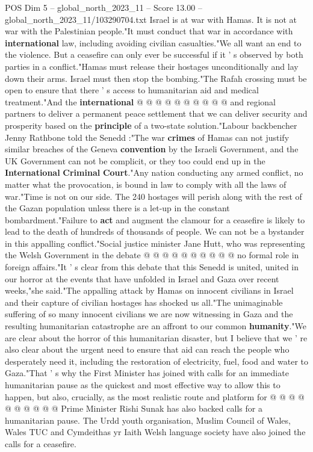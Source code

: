 \begin{textsample}{POS Dim 5 – global\_north\_2023\_11 – Score 13.00 – global\_north\_2023\_11/103290704.txt}
Israel is at war with Hamas.
It is not at war with the Palestinian people."It must conduct that war in accordance with \textbf{international} law, including avoiding civilian casualties."We all want an end to the violence.
But a ceasefire can only ever be successful if it ' s observed by both parties in a conflict."Hamas must release their hostages unconditionally and lay down their arms.
Israel must then stop the bombing."The Rafah crossing must be open to ensure that there ' s access to humanitarian aid and medical treatment."And the \textbf{international} @ @ @ @ @ @ @ @ @ @ and regional partners to deliver a permanent peace settlement that we can deliver security and prosperity based on the \textbf{principle} of a two-state solution."Labour backbencher Jenny Rathbone told the Senedd :"The war \textbf{crimes} of Hamas can not justify similar breaches of the Geneva \textbf{convention} by the Israeli Government, and the UK Government can not be complicit, or they too could end up in the \textbf{International} \textbf{Criminal} \textbf{Court}."Any nation conducting any armed conflict, no matter what the provocation, is bound in law to comply with all the laws of war."Time is not on our side.
The 240 hostages will perish along with the rest of the Gazan population unless there is a let-up in the constant bombardment."Failure to \textbf{act} and augment the clamour for a ceasefire is likely to lead to the death of hundreds of thousands of people.
We can not be a bystander in this appalling conflict."Social justice minister Jane Hutt, who was representing the Welsh Government in the debate @ @ @ @ @ @ @ @ @ @ no formal role in foreign affairs."It ' s clear from this debate that this Senedd is united, united in our horror at the events that have unfolded in Israel and Gaza over recent weeks,"she said."The appalling attack by Hamas on innocent civilians in Israel and their capture of civilian hostages has shocked us all."The unimaginable suffering of so many innocent civilians we are now witnessing in Gaza and the resulting humanitarian catastrophe are an affront to our common \textbf{humanity}."We are clear about the horror of this humanitarian disaster, but I believe that we ' re also clear about the urgent need to ensure that aid can reach the people who desperately need it, including the restoration of electricity, fuel, food and water to Gaza."That ' s why the First Minister has joined with calls for an immediate humanitarian pause as the quickest and most effective way to allow this to happen, but also, crucially, as the most realistic route and platform for @ @ @ @ @ @ @ @ @ @ Prime Minister Rishi Sunak has also backed calls for a humanitarian pause.
The Urdd youth organisation, Muslim Council of Wales, Wales TUC and Cymdeithas yr Iaith Welsh language society have also joined the calls for a ceasefire.

\end{textsample}
